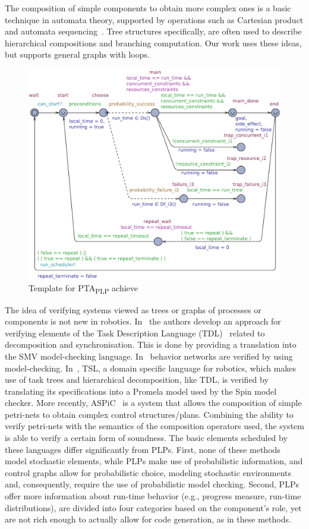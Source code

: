 \documentclass[letterpaper]{article}
\begin{document}
The composition of simple components to obtain more complex ones is a basic technique in automata theory, supported by operations such as Cartesian product and automata sequencing~\citep{automatabook}. Tree structures specifically, are often used to describe hierarchical compositions and branching computation. Our work uses these ideas, but supports general graphs with loops.

\begin{figure}[h]
\centering
\includegraphics[width=0.58\linewidth]{ptaAchieve17_eps_converted_to.pdf}
\caption{Template for PTA\textsubscript{PLP} achieve}
\label{fig:ptaAchieve}
\vspace{-0.0cm}
\end{figure}

The idea of verifying systems viewed as trees or graphs of processes or components is not new in robotics. 
In~\citet{SPS00} the authors develop an approach for verifying elements of the Task Description Language (TDL)~\citep{TCA} related to decomposition and synchronisation. 
This is done by providing a translation into the SMV model-checking language. In~\citet{AKRB13} behavior networks are verified by using model-checking. In~\citet{vTSL}, TSL, a domain specific language for robotics, which makes use of task trees and hierarchical decomposition, like TDL, is verified by translating its specifications into a Promela model used by the Spin model checker. 
More recently, ASPiC~\cite{ASPiC} is a system that allows the composition of simple petri-nets to obtain complex control structures/plans.
Combining the ability to verify petri-nets with the semantics of the composition operators used, the system is able to verify a certain form of soundness.
The basic elements scheduled by these languages differ significantly from PLPs.
First, none of these methods model stochastic elements, while PLPs make use of probabilistic information, and control graphs allow for probabilistic choice, modeling stochastic environments and, consequently, require the use of probabilistic model checking. Second, PLPs offer more information about run-time behavior (e.g., progress measure, run-time distributions), are divided into four categories based on the component's role, yet are not rich enough to actually allow for code generation, as in these methods.  
\end{document}
